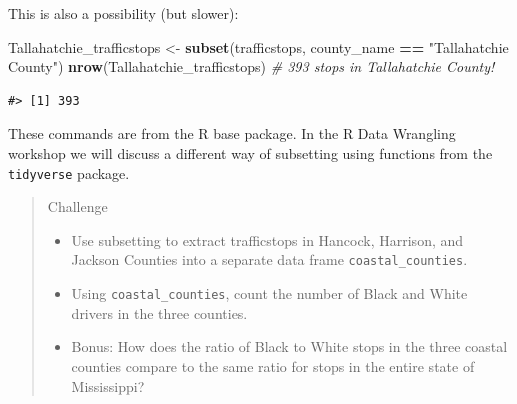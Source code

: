 \documentclass[]{book}
\newenvironment{Shaded}{\begin{snugshade}}{\end{snugshade}}
\newcommand{\KeywordTok}[1]{\textcolor[rgb]{0.13,0.29,0.53}{\textbf{#1}}}
\newcommand{\StringTok}[1]{\textcolor[rgb]{0.31,0.60,0.02}{#1}}
\newcommand{\CommentTok}[1]{\textcolor[rgb]{0.56,0.35,0.01}{\textit{#1}}}
\newcommand{\OperatorTok}[1]{\textcolor[rgb]{0.81,0.36,0.00}{\textbf{#1}}}
\newcommand{\NormalTok}[1]{#1}
\providecommand{\tightlist}{%
  \setlength{\itemsep}{0pt}\setlength{\parskip}{0pt}}
\theoremstyle{definition}
\theoremstyle{definition}
\theoremstyle{definition}
\theoremstyle{remark}
\begin{document}
\begin{Shaded}
\end{Shaded}

This is also a possibility (but slower):

\begin{Shaded}
\begin{Highlighting}[]
\NormalTok{Tallahatchie_trafficstops <-}\StringTok{ }\KeywordTok{subset}\NormalTok{(trafficstops, county_name }\OperatorTok{==}\StringTok{ "Tallahatchie County"}\NormalTok{)}
\KeywordTok{nrow}\NormalTok{(Tallahatchie_trafficstops) }\CommentTok{# 393 stops in Tallahatchie County!}
\end{Highlighting}
\end{Shaded}

\begin{verbatim}
#> [1] 393
\end{verbatim}

These commands are from the R base package. In the R Data Wrangling
workshop we will discuss a different way of subsetting using functions
from the \texttt{tidyverse} package.

\begin{quote}
Challenge

\begin{itemize}
\tightlist
\item
  Use subsetting to extract trafficstops in Hancock, Harrison, and
  Jackson Counties into a separate data frame
  \texttt{coastal\_counties}.
\item
  Using \texttt{coastal\_counties}, count the number of Black and White
  drivers in the three counties.
\item
  Bonus: How does the ratio of Black to White stops in the three coastal
  counties compare to the same ratio for stops in the entire state of
  Mississippi?
\end{itemize}
\end{quote}
\end{document}
